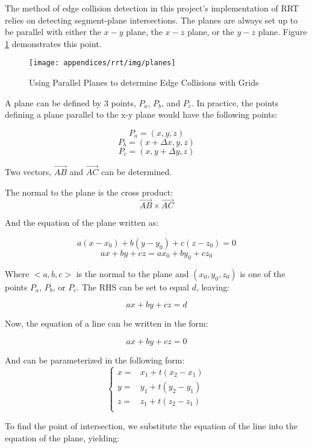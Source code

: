 The method of edge collision detection in this project's implementation of \gls{RRT} relies on detecting segment-plane intersections. The planes are always set up to be parallel with either the $x-y$ plane, the $x-z$ plane, or the $y-z$ plane. Figure \ref{fig:parallelPlanes} demonstrates this point.

\begin{figure}[H]
\begin{centering}
\texttt{[image: appendices/rrt/img/planes]}
\caption{Using Parallel Planes to determine Edge Collisions with Grids}
\label{fig:parallelPlanes}
\end{centering}
\end{figure}

A plane can be defined by 3 points, $P_a$, $P_b$, and $P_c$. In practice, the points defining a plane parallel to the x-y plane would have the following points:

    $$P_a = (x,y,z)$$
    $$P_b = (x+\Delta x,y,z)$$
    $$P_c = (x,y+\Delta y,z)$$

Two vectors, $\vec{AB}$ and $\vec{AC}$ can be determined.

The normal to the plane is the cross product: 
    $$\vec{AB} \times \vec{AC}$$

And the equation of the plane written as:

    $$a(x-x_0) + b(y-y_0) + c(z-z_0) = 0$$
    $$ax + by + cz = ax_0 + by_0 + cz_0$$

Where $<a,b,c>$ is the normal to the plane and $(x_0, y_0, z_0)$ is one of the points $P_a$, $P_b$, or $P_c$.
The RHS can be set to equal $d$, leaving:

    $$ax + by + cz = d$$

Now, the equation of a line can be written in the form:

    $$ax + by + cz = 0$$

And can be parameterized in the following form:
    $$\begin{cases}
        x = & x_1 + t(x_2 - x_1) \\
        y = & y_1 + t(y_2 - y_1) \\
        z = & z_1 + t(z_2 - z_1) \\

    \end{cases}$$

To find the point of intersection, we substitute the equation of the line into the equation of the plane, yielding:

